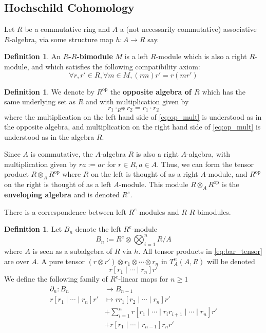 \documentclass[12pt]{article}
\theoremstyle{plain}
\theoremstyle{definition}
\newtheorem{defn}[thm]{Definition} %
\newcommand{\lto}{\longrightarrow}
\begin{document}
\subsection{Hochschild Cohomology}
Let $R$ be a commutative ring and $A$ a (not necessarily commutative) associative $R$-algebra, via some structure map $h: A \lto R$ say.
\begin{defn}
	An \textbf{$R$-$R$-bimodule} $M$ is a left $R$-module which is also a right $R$-module, and which satisfies the following compatibility axiom:
	\begin{equation}
		\forall r, r' \in R, \forall m \in M, (rm)r' = r(mr')
		\end{equation}
	\end{defn}
\begin{defn}
	We denote by $R^{\operatorname{op}}$ the \textbf{opposite algebra of $R$} which has the same underlying set as $R$ and with multiplication given by
	\begin{equation}\label{eq:op_mult}
		r_1 \cdot_{R^{\operatorname{op}}}r_2 = r_1 \cdot r_2
	\end{equation}
	where the multiplication on the left hand side of \eqref{eq:op_mult} is understood as in the opposite algebra, and multiplication on the right hand side of \eqref{eq:op_mult} is understood as in the algebra $R$.
	
	Since $A$ is commutative, the $A$-algebra $R$ is also a right $A$-algebra, with multiplication given by $r a := a r$ for $r \in R, a \in A$. Thus, we can form the tensor product $R \otimes_A R^{\operatorname{op}}$ where $R$ on the left is thought of as a right $A$-module, and $R^{\operatorname{op}}$ on the right is thought of as a left $A$-module. This module $R \otimes_A R^{\operatorname{op}}$ is the \textbf{enveloping algebra} and is denoted $R^e$.
	\end{defn}
There is a correspondence between left $R^e$-modules and $R$-$R$-bimodules.
\begin{defn}
	Let $B_n$ denote the left $R^e$-module
	\begin{equation}\label{eq:bar_tensor}
		B_n := R^e \otimes \bigotimes_{i = 1}^nR/A
		\end{equation}
	where $A$ is seen as a subalgebra of $R$ via $h$. All tensor products in \eqref{eq:bar_tensor} are over $A$. A pure tensor $(r \otimes r') \otimes r_1 \otimes \cdots \otimes r_n$ in $T_A^n(A,R)$ will be denoted
	\begin{equation}
		r [r_1 \mid \cdots \mid r_n] r'
		\end{equation}
	We define the following family of $R^e$-linear maps for $n \geq 1$
	\begin{align*}
		\partial_{n}: B_n &\lto B_{n-1}\\
		r[r_1 \mid \cdots \mid r_n]r' &\longmapsto rr_1[r_2 \mid \cdots \mid r_n]r'\\
		&+ \sum_{i=1}^n r[r_1 \mid \cdots \mid r_{i} r_{i+1} \mid \cdots \mid r_n]r'\\
		&+ r[r_1 \mid \cdots \mid r_{n-1}]r_n r'
		\end{align*}
	\end{defn}
\end{document}
